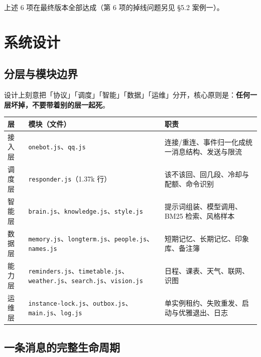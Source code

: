 \documentclass[11pt,a4paper]{ctexart}
\begin{document}
上述 6 项在最终版本全部达成（第 6 项的掉线问题另见 \S 5.2 案例一）。

\section{系统设计}

\subsection{分层与模块边界}

设计上刻意把「协议」「调度」「智能」「数据」「运维」分开，核心原则是：\textbf{任何一层坏掉，不要带着别的层一起死}。

\begin{table}[H]
\centering\small
\begin{tabularx}{\textwidth}{@{}llX@{}}
\toprule
层 & 模块（文件） & 职责 \\
\midrule
接入层 & \texttt{onebot.js}、\texttt{qq.js} & 连接/重连、事件归一化成统一消息结构、发送与限流 \\
调度层 & \texttt{responder.js}（1.37k 行） & 该不该回、回几段、冷却与配额、命令识别 \\
智能层 & \texttt{brain.js}、\texttt{knowledge.js}、\texttt{style.js} & 提示词组装、模型调用、BM25 检索、风格样本 \\
数据层 & \texttt{memory.js}、\texttt{longterm.js}、\texttt{people.js}、\texttt{names.js} & 短期记忆、长期记忆、印象库、备注簿 \\
能力层 & \texttt{reminders.js}、\texttt{timetable.js}、\texttt{weather.js}、\texttt{search.js}、\texttt{vision.js} & 日程、课表、天气、联网、识图 \\
运维层 & \texttt{instance-lock.js}、\texttt{outbox.js}、\texttt{main.js}、\texttt{log.js} & 单实例租约、失败重发、启动与优雅退出、日志 \\
\bottomrule
\end{tabularx}
\end{table}

\subsection{一条消息的完整生命周期}
\end{document}
